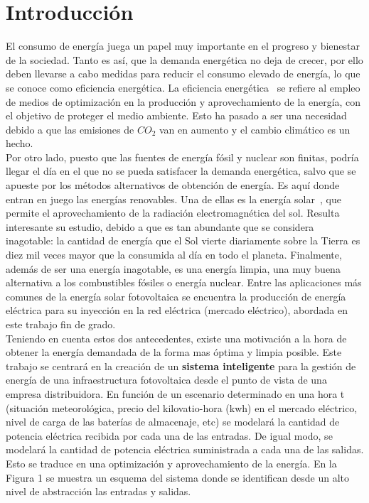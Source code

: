 \chapter{Introducción}
\label{cap:Introduccion}
El consumo de energía juega un papel muy importante en el progreso y bienestar de la sociedad. Tanto es así, que la demanda energética no deja de crecer, por ello deben llevarse a cabo medidas para reducir el consumo elevado de energía, lo que se conoce como eficiencia energética. La eficiencia energética~\cite{GarSa12} se refiere al empleo de medios de optimización en la producción y aprovechamiento de la energía, con el objetivo de proteger el medio ambiente. Esto ha pasado a ser una necesidad debido a que las emisiones de $ CO_{2} $ van en aumento y el cambio climático es un hecho.  \\

Por otro lado, puesto que las fuentes de energía fósil y nuclear son finitas, podría llegar el día en el que no se pueda satisfacer la demanda energética, salvo que se apueste por los métodos alternativos de obtención de energía. Es aquí donde entran en juego las energías renovables. Una de ellas es la energía solar~\cite{Perp12}, que permite el aprovechamiento de la radiación electromagnética del sol. Resulta interesante su estudio, debido a que es tan abundante que se considera inagotable: la cantidad de energía que el Sol vierte diariamente sobre la Tierra es diez mil veces mayor que la consumida al día en todo el planeta. Finalmente, además de ser una energía inagotable, es una energía limpia, una muy buena alternativa a los combustibles fósiles o energía nuclear. Entre las aplicaciones más comunes de la energía solar fotovoltaica se encuentra la producción de energía eléctrica para su inyección en la red eléctrica (mercado eléctrico), abordada en este trabajo fin de grado. \\



Teniendo en cuenta estos dos antecedentes, existe una motivación a la hora de obtener la energía demandada de la forma mas óptima y limpia posible. Este trabajo se centrará en la creación de un \textbf{sistema inteligente} para la gestión de energía de una infraestructura fotovoltaica desde el punto de vista de una empresa distribuidora. En función de un escenario determinado en una hora t (situación meteorológica, precio del kilovatio-hora (kwh) en el mercado eléctrico, nivel de carga de las baterías de almacenaje, etc) se modelará la cantidad de potencia eléctrica recibida por cada una de las entradas. De igual modo, se modelará la cantidad de potencia eléctrica suministrada a cada una de las salidas. Esto se traduce en una optimización y aprovechamiento de la energía.
En la Figura 1 se muestra un esquema del sistema donde se identifican desde un alto nivel de abstracción las entradas y salidas.\\

